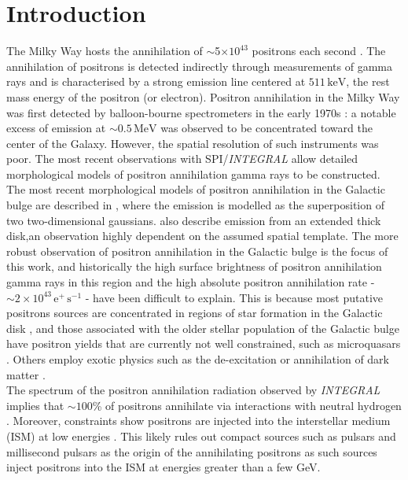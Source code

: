 \documentclass[a4paper,fleqn,usenatbib]{mnras}
\begin{document}
\section{Introduction}\label{sec:intro}
The Milky Way hosts the annihilation of $\sim$5$\times 10^{43}$ positrons each second \citep{Siegert16}. The annihilation of positrons is detected indirectly through measurements of gamma rays and is characterised by a strong emission line centered at $511\,\mathrm{keV}$, the rest mass energy of the positron (or electron). Positron annihilation in the Milky Way was first detected by balloon-bourne spectrometers in the early 1970s \citep{Johnson72}: a notable excess of emission at $\sim 0.5\,\mathrm{MeV}$ was observed to be concentrated toward the center of the Galaxy. However, the spatial resolution of such instruments was poor. The most recent observations with SPI/\textit{INTEGRAL} \citep{Knoedelseder05, Weidenspointner08, Siegert16} allow detailed morphological models of positron annihilation gamma rays to be constructed.\\
The most recent morphological models of positron annihilation in the Galactic bulge are described in \cite{Siegert16}, where the emission is modelled as the superposition of two two-dimensional gaussians. \cite{Siegert16} also describe emission from an extended thick disk,an observation highly dependent on the assumed spatial template. The more robust observation of positron annihilation in the Galactic bulge is the focus of this work, and historically the high surface brightness of positron annihilation gamma rays in this region and the high absolute positron annihilation rate - $\sim2\times10^{43}\,\mathrm{e^+\,s^{-1}}$ - have been difficult to explain. This is because most putative positrons sources are concentrated in regions of star formation in the Galactic disk \citep{Prantzos11, RKL79}, and those associated with the older stellar population of the Galactic bulge have positron yields that are currently not well constrained, such as microquasars \citep{Siegertmicroquasars}. Others employ exotic physics such as the de-excitation or annihilation of dark matter \citep[e.g.][]{Finkbeiner2007, Boehm09}.\\
The spectrum of the positron annihilation radiation observed by \textit{INTEGRAL} implies that  $\sim100$\% of positrons annihilate via interactions with neutral hydrogen \citep[charge exchange, see][for an overview]{Guessoum05}. Moreover, constraints show positrons are injected into the interstellar medium (ISM) at low energies \citep[$\leq\sim3-7\,\mathrm{MeV}$,][]{Aharonian81, Beacom06}. This likely rules out compact sources such as pulsars and millisecond pulsars as the origin of the annihilating positrons as such sources inject positrons into the ISM at energies greater than a few GeV.\\
\end{document}
